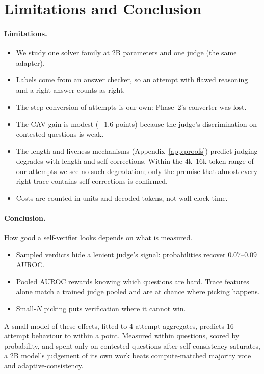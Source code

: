 \documentclass[11pt]{article}
\begin{document}
\section{Limitations and Conclusion}
\label{sec:conclusion}

\paragraph{Limitations.}
\begin{itemize}
\item We study one solver family at 2B parameters and one judge (the same adapter).
\item Labels come from an answer checker, so an attempt with flawed reasoning and a right answer counts as right.
\item The step conversion of attempts is our own: Phase~2's converter was lost.
\item The CAV gain is modest ($+1.6$ points) because the judge's discrimination on contested questions is weak.
\item The length and liveness mechanisms (Appendix~\ref{app:proofs}) predict judging degrades with length and
  self-corrections. Within the 4k--16k-token range of our attempts we see no such degradation; only the premise that
  almost every right trace contains self-corrections is confirmed.
\item Costs are counted in units and decoded tokens, not wall-clock time.
\end{itemize}

\paragraph{Conclusion.}
How good a self-verifier looks depends on what is measured.
\begin{itemize}
\item Sampled verdicts hide a lenient judge's signal: probabilities recover $0.07$--$0.09$ AUROC.
\item Pooled AUROC rewards knowing which questions are hard. Trace features alone match a trained judge pooled and are
  at chance where picking happens.
\item Small-$N$ picking puts verification where it cannot win.
\end{itemize}
A small model of these effects, fitted to 4-attempt aggregates, predicts 16-attempt behaviour to within a point.
Measured within questions, scored by probability, and spent only on contested questions after self-consistency
saturates, a 2B model's judgement of its own work beats compute-matched majority vote and adaptive-consistency.




\end{document}
